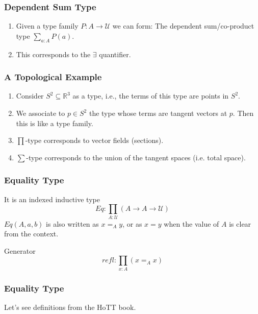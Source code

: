 \documentclass[14pt,compress]{beamer}
\newcommand{\U}{\mathcal{U}}
\newcommand{\R}{\mathbb{R}}
\begin{document}
\begin{frame}\label{frame : dependent sum type}
\frametitle{Dependent Sum Type}

\begin{enumerate}

\item Given a type family \textcolor{beamer@mathtext}{$P : A \to \U $} we can form:
The \textcolor{beamer@deepblue}{dependent sum/co-product type}
\textcolor{beamer@mathtext}{$\sum_{a : A} P(a)$}.\smallskip

\pause
\item This corresponds to the \textcolor{beamer@mathtext}{$\exists$} quantifier.
\end{enumerate}
\end{frame}
\begin{frame}\label{frame : topological example}
\frametitle{A Topological Example}

\begin{enumerate}
\pause
\item Consider \textcolor{beamer@mathtext}{$S^2 \subseteq \R^3$} as a type, i.e.,
the terms of this type are points in \textcolor{beamer@mathtext}{$S^2$}.      
\pause
\item We associate to \textcolor{beamer@mathtext}{$p \in S^2$}
the type whose terms are tangent vectors at \textcolor{beamer@mathtext}{$p$}.
Then this is like a type family.      
\pause
\item \textcolor{beamer@mathtext}{$\prod$}-type corresponds to vector fields (sections).
\pause
\item \textcolor{beamer@mathtext}{$\sum$}-type corresponds to the union of the
tangent spaces (i.e. total space).
\end{enumerate}
\end{frame}

\begin{frame}\label{frame : equality type}
\frametitle{Equality Type}
It is an indexed inductive type
\textcolor{beamer@mathtext}{\[ Eq : \prod_{A : \U} (A \to A \to \U) \]}
$Eq(A,a,b)$ is also written as \textcolor{beamer@mathtext}{$x =_A y$},
or as \textcolor{beamer@mathtext}{$x = y$} when the value of $A$ is clear from the context.
\pause
\begin{block}{Generator}
\textcolor{beamer@mathtext}{\[ refl : \prod_{x : A} (x =_A x) \]}
\end{block}

\end{frame}

\begin{frame}\label{frame : equality type recursor}
\frametitle{Equality Type}
Let's see definitions from the HoTT book.

\end{frame}

\end{document}

